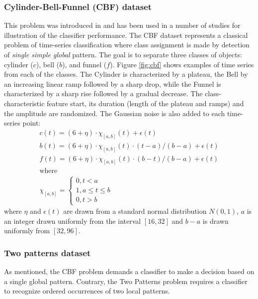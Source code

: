 \subsubsection{Cylinder-Bell-Funnel (CBF) dataset}
This problem was introduced in \cite{cbf} and has been used in a number of studies for illustration of 
the classifier performance.
The CBF dataset represents a classical problem of time-series classification where class assignment is 
made by detection of \textit{single simple global} pattern. 
The goal is to separate three classes of objects: cylinder ($c$), bell ($b$), and funnel ($f$).  Figure \ref{fig:cbf} 
shows examples of time series from each of the classes. 
The Cylinder is characterized by a plateau, the Bell by an increasing linear ramp followed by a sharp drop, 
while the Funnel is characterized by a sharp rise followed by a gradual decrease. 
The class-characteristic feature start, its duration (length of the plateau and ramps) and the amplitude are randomized. 
The Gaussian noise is also added to each time-series point:
\begin{equation}
\label{eq:cbf}
\begin{split}
c(t)=(6+\eta)\cdot\chi_{[a,b]}(t)+\epsilon(t) \\
b(t)=(6+\eta)\cdot\chi_{[a,b]}(t)\cdot(t-a)/(b-a)+\epsilon(t) \\
f(t)=(6+\eta)\cdot\chi_{[a,b]}(t)\cdot(b-t)/(b-a)+\epsilon(t) \\
\text{where} \\
\chi_{[a,b]}=\begin{cases}
0,t < a \\
1,a\leq t\leq b\\
0,t > b \end{cases}
\end{split}                                                      
\end{equation}
where $\eta$ and $\epsilon(t)$ are drawn from a standard normal distribution $N(0,1)$, $a$ is an integer 
drawn uniformly from the interval $[16,32]$ and $b-a$ is drawn uniformly from $[32,96]$.

\subsubsection{Two patterns dataset}
As mentioned, the CBF problem demands a classifier to make a decision based on a single global pattern. 
Contrary, the Two Patterns problem requires a classifier to recognize ordered occurrences of two local patterns.

